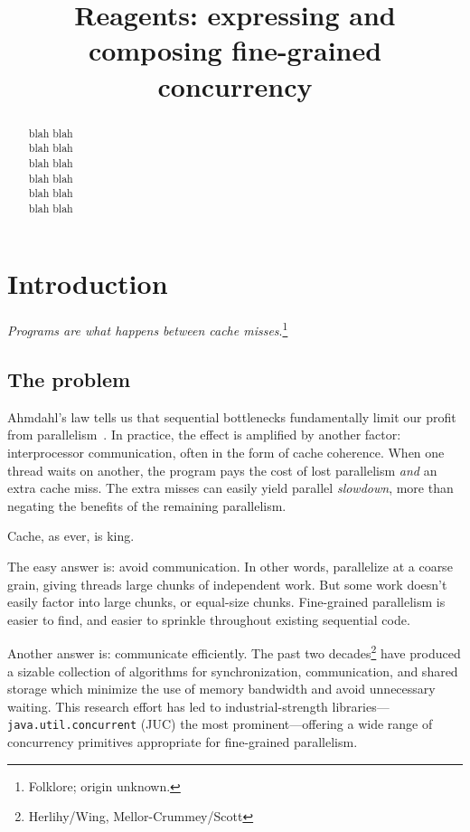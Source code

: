 \documentclass[preprint]{sigplanconf}
\begin{document}
\authorinfo{}{}{}
\title{Reagents: expressing and composing fine-grained concurrency}
\maketitle

\begin{abstract}
blah blah\\
blah blah\\
blah blah\\
blah blah\\
blah blah\\
blah blah
\end{abstract}

\section{Introduction}

\emph{Programs are what happens between cache
  misses}.\footnote{Folklore; origin unknown.}

\subsection*{The problem}

Ahmdahl's law tells us that sequential bottlenecks fundamentally limit our
profit from parallelism~\cite{?}.  In practice, the effect is amplified by
another factor: interprocessor communication, often in the form of cache
coherence.  When one thread waits on another, the program pays the cost of
lost parallelism \emph{and} an extra cache miss.  The extra misses can easily
yield parallel \emph{slowdown}, more than negating the benefits of the
remaining parallelism.  

Cache, as ever, is king.

The easy answer is: avoid communication.  In other words, parallelize at a
coarse grain, giving threads large chunks of independent work.  But some work
doesn't easily factor into large chunks, or equal-size chunks.  Fine-grained
parallelism is easier to find, and easier to sprinkle throughout existing
sequential code.

Another answer is: communicate efficiently.  The past two
decades\footnote{Herlihy/Wing, Mellor-Crummey/Scott} have produced a sizable
collection of algorithms for synchronization, communication, and shared
storage which minimize the use of memory bandwidth and avoid unnecessary
waiting.  This research effort has led to industrial-strength
libraries---\texttt{java.util.concurrent} (JUC) the most prominent---offering
a wide range of concurrency primitives appropriate for fine-grained
parallelism.
\end{document}
